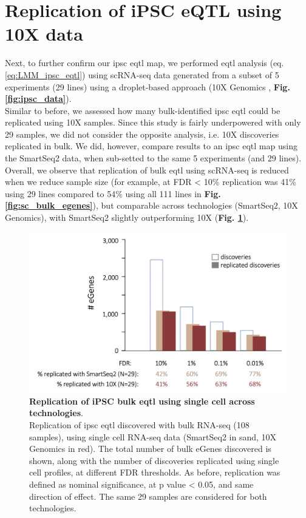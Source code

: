 \newpage

\section{Replication of iPSC eQTL using 10X data}

Next, to further confirm our \gls{ipsc} \gls{eqtl} map, we performed \gls{eqtl} analysis (eq. \eqref{eq:LMM_ipsc_eqtl}) using scRNA-seq data generated from a subset of 5 experiments (29 lines) using a droplet-based approach (10X Genomics \cite{zheng2017massively}, \textbf{Fig. \ref{fig:ipsc_data}}).\\

Similar to before, we assessed how many bulk-identified \gls{ipsc} \gls{eqtl} could be replicated using 10X samples.
Since this study is fairly underpowered with only 29 samples, we did not consider the opposite analysis, i.e. 10X discoveries replicated in bulk.
We did, however, compare results to an \gls{ipsc} \gls{eqtl} map using the SmartSeq2 data, when sub-setted to the same 5 experiments (and 29 lines). \\

Overall, we observe that replication of bulk \gls{eqtl} using scRNA-seq is reduced when we reduce sample size (for example, at FDR < 10\% replication was 41\% using 29 lines compared to 54\% using all 111 lines in \textbf{Fig. \ref{fig:sc_bulk_egenes}}), but comparable across technologies (SmartSeq2, 10X Genomics), with SmartSeq2 slightly outperforming 10X (\textbf{Fig. \ref{fig:sc_bulk_10x_egenes}}).

\begin{figure}[h]
\includegraphics[width=14.5cm]{Chapter3/Fig/sc_vs_bulk_vs_10x.png}
\caption[iPSC bulk eQTL replication]{\textbf{Replication of iPSC bulk \gls{eqtl} using single cell across technologies}.\\
Replication of \gls{ipsc} \gls{eqtl} discovered with bulk RNA-seq (108 samples), using single cell RNA-seq data (SmartSeq2 in sand, 10X Genomics in red). 
The total number of bulk eGenes discovered is shown, along with the number of discoveries replicated using single cell profiles, at different FDR thresholds. 
As before, replication was defined as nominal significance, at p value < 0.05, and same direction of effect. 
The same 29 samples are considered for both technologies.}
\label{fig:sc_bulk_10x_egenes}
\end{figure}

